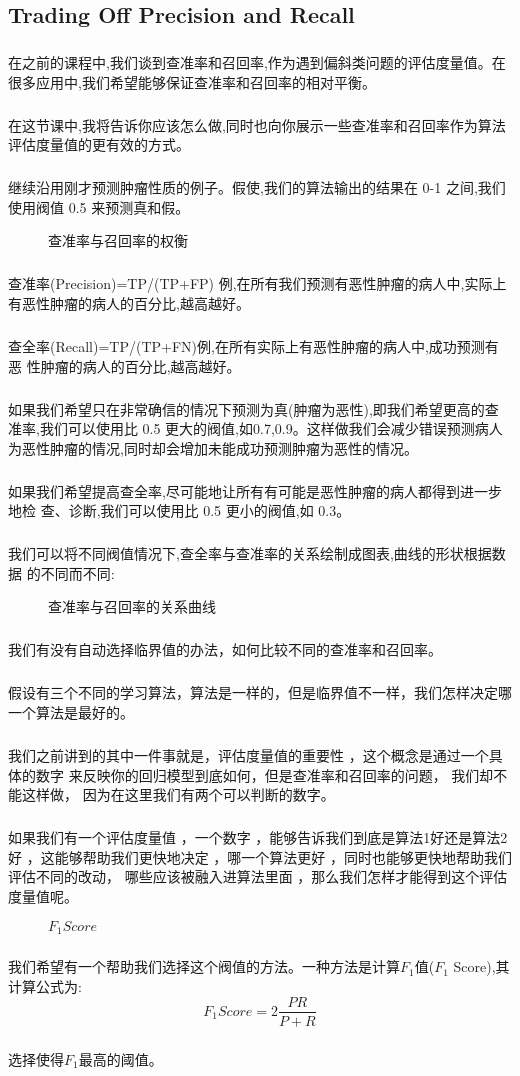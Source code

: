 \documentclass{article}
\begin{document}
\begin{CJK}{UTF8}{gbsn}
\subsection{Trading Off Precision and Recall}
\subparagraph{}
在之前的课程中,我们谈到查准率和召回率,作为遇到偏斜类问题的评估度量值。在很多应用中,我们希望能够保证查准率和召回率的相对平衡。
\subparagraph{}
在这节课中,我将告诉你应该怎么做,同时也向你展示一些查准率和召回率作为算法评估度量值的更有效的方式。
\subparagraph{}
继续沿用刚才预测肿瘤性质的例子。假使,我们的算法输出的结果在 0-1 之间,我们使用阀值 0.5 来预测真和假。
\begin{figure}[H]
\label{fig:690}
\caption{查准率与召回率的权衡}
\end{figure}
\subparagraph{}
查准率(Precision)=TP/(TP+FP) 例,在所有我们预测有恶性肿瘤的病人中,实际上
有恶性肿瘤的病人的百分比,越高越好。
\subparagraph{}
查全率(Recall)=TP/(TP+FN)例,在所有实际上有恶性肿瘤的病人中,成功预测有恶
性肿瘤的病人的百分比,越高越好。
\subparagraph{}
如果我们希望只在非常确信的情况下预测为真(肿瘤为恶性),即我们希望更高的查准率,我们可以使用比 0.5 更大的阀值,如0.7,0.9。这样做我们会减少错误预测病人为恶性肿瘤的情况,同时却会增加未能成功预测肿瘤为恶性的情况。
\subparagraph{}
如果我们希望提高查全率,尽可能地让所有有可能是恶性肿瘤的病人都得到进一步地检
查、诊断,我们可以使用比 0.5 更小的阀值,如 0.3。
\subparagraph{}
我们可以将不同阀值情况下,查全率与查准率的关系绘制成图表,曲线的形状根据数据
的不同而不同:
\begin{figure}[H]
\label{fig:691}
\caption{查准率与召回率的关系曲线}
\end{figure}
\subparagraph{}
我们有没有自动选择临界值的办法，如何比较不同的查准率和召回率。
\subparagraph{}
假设有三个不同的学习算法，算法是一样的，但是临界值不一样，我们怎样决定哪一个算法是最好的。
\subparagraph{}
我们之前讲到的其中一件事就是，评估度量值的重要性 ，这个概念是通过一个具体的数字 来反映你的回归模型到底如何，但是查准率和召回率的问题， 我们却不能这样做， 因为在这里我们有两个可以判断的数字。 
\subparagraph{}
如果我们有一个评估度量值 ，一个数字 ，能够告诉我们到底是算法1好还是算法2好 ，这能够帮助我们更快地决定 ，哪一个算法更好 ，同时也能够更快地帮助我们评估不同的改动， 哪些应该被融入进算法里面 ，那么我们怎样才能得到这个评估度量值呢。
\begin{figure}[H]
\label{fig:694}
\caption{$F_1Score$}
\end{figure}
\subparagraph{}
我们希望有一个帮助我们选择这个阀值的方法。一种方法是计算$F_1$值($F_1$ Score),其计算公式为:
\begin{equation}
F_1Score=2\frac{PR}{P+R}
\end{equation}
\subparagraph{}
选择使得$F_1$最高的阈值。
\begin{figure}[H]
\label{fig:692}
\end{figure}
\begin{figure}[H]
\label{fig:693}
\end{figure}

\end{CJK}
\end{document}
